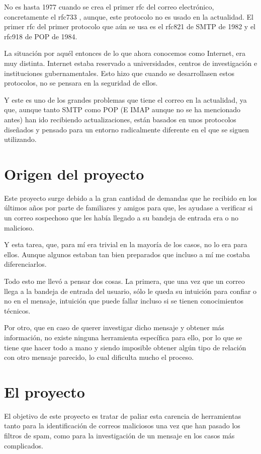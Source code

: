No es hasta 1977 cuando se crea el primer rfc del correo electrónico, concretamente el rfc733 \cite{rfc733}, aunque, este protocolo no es usado en la actualidad. El primer rfc del primer protocolo que aún se usa es el rfc821 \cite{rfc821}  de SMTP de 1982 y el rfc918 \cite{rfc918}  de POP de 1984.

La situación por aquél entonces de lo que ahora conocemos como Internet, era muy distinta. Internet estaba reservado a universidades, centros de investigación e instituciones gubernamentales. Esto hizo que cuando se desarrollasen estos protocolos, no se pensara en la seguridad de ellos.

Y este es uno de los grandes problemas que tiene el correo en la actualidad, ya que, aunque tanto SMTP como POP (E IMAP \cite{rfc1064} aunque no se ha mencionado antes) han ido recibiendo actualizaciones, están basados en unos protocolos diseñados y pensado para un entorno radicalmente diferente en el que se siguen utilizando.

\section{Origen del proyecto}
Este proyecto surge debido a la gran cantidad de demandas que he recibido en los últimos años por parte de familiares y amigos para que, les ayudase a verificar si un correo sospechoso que les había llegado a su bandeja de entrada era o no malicioso. 

Y esta tarea, que, para mí era trivial en la mayoría de los casos, no lo era para ellos. Aunque algunos estaban tan bien preparados que incluso a mí me costaba diferenciarlos. 

Todo esto me llevó a pensar dos cosas. La primera, que una vez que un correo llega a la bandeja de entrada del usuario, sólo le queda su intuición para confiar o no en el mensaje, intuición que puede fallar incluso si se tienen conocimientos técnicos.

Por otro, que en caso de querer investigar dicho mensaje y obtener más información, no existe ninguna herramienta específica para ello, por lo que se tiene que hacer todo a mano y siendo imposible obtener algún tipo de relación con otro mensaje parecido, lo cual dificulta mucho el proceso. 

\section{El proyecto}
El objetivo de este proyecto es tratar de paliar esta carencia de herramientas tanto para la identificación de correos maliciosos una vez que han pasado los filtros de spam, como para la investigación de un mensaje en los casos más complicados. 

